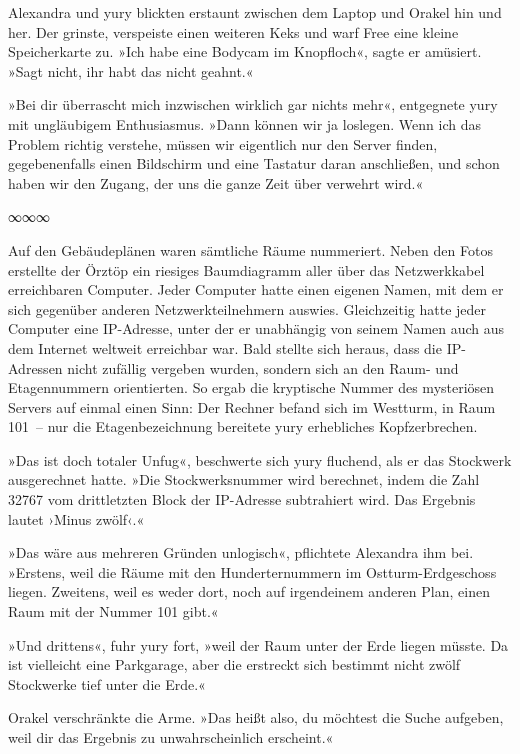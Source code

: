 Alexandra und yury blickten erstaunt zwischen dem Laptop und Orakel hin und her. Der grinste, verspeiste einen weiteren Keks und warf Free eine kleine Speicherkarte zu. »Ich habe eine Bodycam im Knopfloch«, sagte er amüsiert. »Sagt nicht, ihr habt das nicht geahnt.«

»Bei dir überrascht mich inzwischen wirklich gar nichts mehr«, entgegnete yury mit ungläubigem Enthusiasmus. »Dann können wir ja loslegen. Wenn ich das Problem richtig verstehe, müssen wir eigentlich nur den Server finden, gegebenenfalls einen Bildschirm und eine Tastatur daran anschließen, und schon haben wir den Zugang, der uns die ganze Zeit über verwehrt wird.«

\begin{center}
∞∞∞
\end{center}

Auf den Gebäudeplänen waren sämtliche Räume nummeriert. Neben den Fotos erstellte der Örztöp ein riesiges Baumdiagramm aller über das Netzwerkkabel erreichbaren Computer. Jeder Computer hatte einen eigenen Namen, mit dem er sich gegenüber anderen Netzwerkteilnehmern auswies. Gleichzeitig hatte jeder Computer eine IP-Adresse, unter der er unabhängig von seinem Namen auch aus dem Internet weltweit erreichbar war. Bald stellte sich heraus, dass die IP-Adressen nicht zufällig vergeben wurden, sondern sich an den Raum- und Etagennummern orientierten. So ergab die kryptische Nummer des mysteriösen Servers auf einmal einen Sinn: Der Rechner befand sich im Westturm, in Raum 101~– nur die Etagenbezeichnung bereitete yury erhebliches Kopfzerbrechen.

»Das ist doch totaler Unfug«, beschwerte sich yury fluchend, als er das Stockwerk ausgerechnet hatte. »Die Stockwerksnummer wird berechnet, indem die Zahl 32767 vom drittletzten Block der IP-Adresse subtrahiert wird. Das Ergebnis lautet ›Minus zwölf‹.«

»Das wäre aus mehreren Gründen unlogisch«, pflichtete Alexandra ihm bei. »Erstens, weil die Räume mit den Hunderternummern im Ostturm-Erdgeschoss liegen. Zweitens, weil es weder dort, noch auf irgendeinem anderen Plan, einen Raum mit der Nummer 101 gibt.«

»Und drittens«, fuhr yury fort, »weil der Raum unter der Erde liegen müsste. Da ist vielleicht eine Parkgarage, aber die erstreckt sich bestimmt nicht zwölf Stockwerke tief unter die Erde.«

Orakel verschränkte die Arme. »Das heißt also, du möchtest die Suche aufgeben, weil dir das Ergebnis zu unwahrscheinlich erscheint.«

